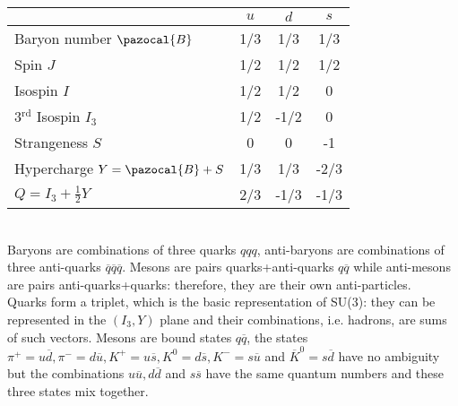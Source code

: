 \documentclass[10.75pt,a4paper,openright,bottom=2cm]{article}
\begin{document}
\begin{table}[h]
    \centering
    \begin{tabular}{l|ccc}
    \hline
    \cellcolor{gray!50} & \cellcolor{yellow!50}$u$ & \cellcolor{yellow!50}$d$ & \cellcolor{yellow!50}$s$\\
    \hline\hline
    \cellcolor{yellow!50}Baryon number $\pazocal{B}$ & 1/3 & 1/3 & 1/3\\
    \hline
    \cellcolor{yellow!50}Spin $J$ & 1/2 & 1/2 & 1/2\\
    \hline
    \cellcolor{yellow!50}Isospin $I$ & 1/2 & 1/2 & 0\\
    \hline
    \cellcolor{yellow!50}3$^{\text{rd}}$ Isospin $I_3$ & 1/2 & -1/2 & 0\\
    \hline
    \cellcolor{yellow!50}Strangeness $S$ & 0 & 0 & -1\\
    \hline
    \cellcolor{yellow!50}Hypercharge $Y=\pazocal{B}+S$ & 1/3 & 1/3 & -2/3\\
    \hline
    \cellcolor{yellow!50}$Q=I_3+\frac{1}{2}Y$ & 2/3 & -1/3 & -1/3\\
    \hline
    \end{tabular}
    \caption*{}
    \label{tab:my_label}
\end{table}\\
Baryons are combinations of three quarks $qqq$, anti-baryons are combinations of three anti-quarks $\overline{q}\overline{q}\overline{q}$. Mesons are pairs quarks+anti-quarks $q\overline{q}$ while anti-mesons are pairs anti-quarks+quarks: therefore, they are their own anti-particles.\\
Quarks form a triplet, which is the basic representation of SU(3): they can be represented in the $(I_3,Y)$ plane and their combinations, i.e. hadrons, are sums of such vectors. Mesons are bound states $q\overline{q}$, the states $\pi^+=u\overline{d}, \pi^-=d\overline{u}, K^+=u\overline{s}, K^0=d\overline{s}, K^-=s\overline{u}$ and $\overline{K}^0=s\overline{d}$ have no ambiguity but the combinations $u\overline{u}, d\overline{d}$ and $s\overline{s}$ have the same quantum numbers and these three states mix together. 
\end{document}
